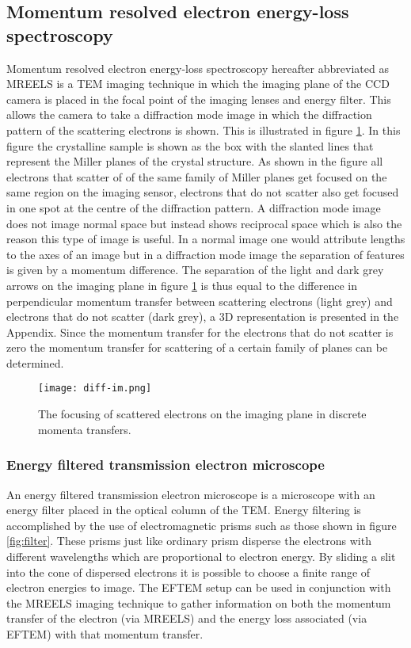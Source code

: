 \subsection{Momentum resolved electron energy-loss spectroscopy}
\label{sec:MREELS}
Momentum resolved electron energy-loss spectroscopy hereafter abbreviated as MREELS is a TEM imaging technique in which the imaging plane of the CCD camera is placed in the focal point of the imaging lenses and energy filter.
This allows the camera to take a diffraction mode image in which the diffraction pattern of the scattering electrons is shown. This is illustrated in figure \ref{fig:diff-im}. In this figure the crystalline sample is shown as the box with the slanted lines that represent the Miller planes of the crystal structure.
As shown in the figure all electrons that scatter of of the same family of Miller planes get focused on the same region on the imaging sensor, electrons that do not scatter also get focused in one spot at the centre of the diffraction pattern.
A diffraction mode image does not image normal space but instead shows reciprocal space which is also the reason this type of image is useful. In a normal image one would attribute lengths to the axes of an image but in a diffraction mode image the separation of features is given by a momentum difference.
The separation of the light and dark grey arrows on the imaging plane in figure \ref{fig:diff-im} is thus equal to the difference in perpendicular momentum transfer between scattering electrons (light grey) and electrons that do not scatter (dark grey), a 3D representation is presented in the Appendix.
Since the momentum transfer for the electrons that do not scatter is zero the momentum transfer for scattering of a certain family of planes can be determined.
%
\begin{figure}[H]
	\centering
	\texttt{[image: diff-im.png]}
	\caption{The focusing of scattered electrons on the imaging plane in discrete momenta transfers.}
	\label{fig:diff-im}
\end{figure}
%
\subsubsection{Energy filtered transmission electron microscope}
\label{sec:eftem}
An energy filtered transmission electron microscope is a microscope with an energy filter placed in the optical column of the TEM. Energy filtering is accomplished by the use of electromagnetic prisms such as those shown in figure \ref{fig:filter}.
These prisms just like ordinary prism disperse the electrons with different wavelengths which are proportional to electron energy. By sliding a slit into the cone of dispersed electrons it is possible to choose a finite range of electron energies to image.
The EFTEM setup can be used in conjunction with the MREELS imaging technique to gather information on both the momentum transfer of the electron (via MREELS) and the energy loss associated (via EFTEM) with that momentum transfer.
%
